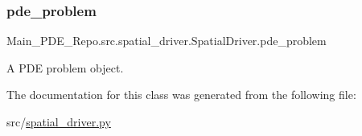 \subsubsection{\texorpdfstring{pde\+\_\+problem}{pde\_problem}}
{\footnotesize\ttfamily Main\+\_\+\+P\+D\+E\+\_\+\+Repo.\+src.\+spatial\+\_\+driver.\+Spatial\+Driver.\+pde\+\_\+problem}



A P\+DE problem object. 



The documentation for this class was generated from the following file\+:\begin{DoxyCompactItemize}
\item 
src/\hyperlink{spatial__driver_8py}{spatial\+\_\+driver.\+py}\end{DoxyCompactItemize}
